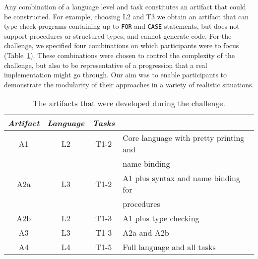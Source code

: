 Any combination of a language level and task constitutes an artifact that could be constructed.
For example, choosing L2 and T3 we obtain an artifact that can type check programs containing up to \verb|FOR| and \verb|CASE| statements, but does not support procedures or structured types, and cannot generate code.
For the challenge, we specified four combinations on which participants were to focus (Table~\ref{tab:artifacts}).
These combinations were chosen to control the complexity of the challenge, but also to be representative of a progression that a real implementation might go through.
Our aim was to enable participants to demonstrate the modularity of their approaches in a variety of realistic situations.

\begin{table}\centering
\begin{tabular}{|c|c|c|l|} \hline
\emph{Artifact} & \emph{Language} & \emph{Tasks} & \\ \hline
A1  & L2 & T1-2 & Core language with pretty printing and \\
    &    &      & name binding \\ \hline
A2a & L3 & T1-2 & A1 plus syntax and name binding for \\
    &    &      & procedures \\ \hline
A2b & L2 & T1-3 & A1 plus type checking \\ \hline
A3  & L3 & T1-3 & A2a and A2b \\ \hline
A4  & L4 & T1-5 & Full language and all tasks \\ \hline
\end{tabular}
\caption{The artifacts that were developed during the challenge.}
\label{tab:artifacts}
\end{table}
